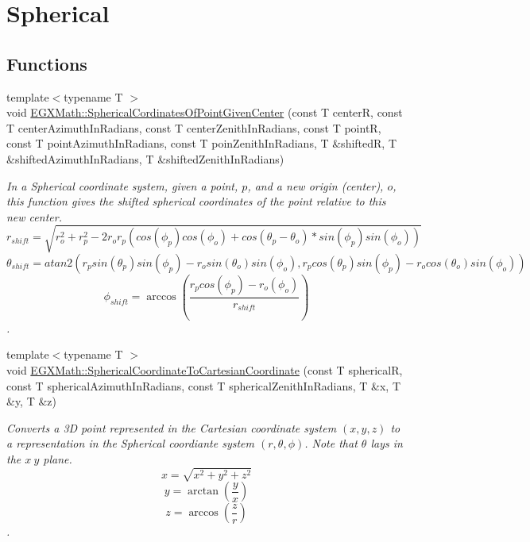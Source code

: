 \hypertarget{group___e_g_x_math-_conversions-_coordinate_conversions-3_d-_spherical}{}\section{Spherical}
\label{group___e_g_x_math-_conversions-_coordinate_conversions-3_d-_spherical}
\subsection*{Functions}
\begin{DoxyCompactItemize}
\item 
{\footnotesize template$<$typename T $>$ }\\void \mbox{\hyperlink{group___e_g_x_math-_conversions-_coordinate_conversions-3_d-_spherical_gaa9b50c4837e1cbea569de6f7bc90a3b6}{E\+G\+X\+Math\+::\+Spherical\+Cordinates\+Of\+Point\+Given\+Center}} (const T centerR, const T center\+Azimuth\+In\+Radians, const T center\+Zenith\+In\+Radians, const T pointR, const T point\+Azimuth\+In\+Radians, const T poin\+Zenith\+In\+Radians, T \&shiftedR, T \&shifted\+Azimuth\+In\+Radians, T \&shifted\+Zenith\+In\+Radians)
\begin{DoxyCompactList}\small\item\em In a Spherical coordinate system, given a point, $p$, and a new origin (center), $o$, this function gives the shifted spherical coordinates of the point relative to this new center. \[ r_{shift} = \sqrt{r_o^2+r_p^2 - 2 r_o r_p ( cos(\phi_p) cos(\phi_o) + cos(\theta_p-\theta_o) * sin(\phi_p) sin(\phi_o))}\] \[ \theta_{shift} = atan2( r_p sin(\theta_p) sin(\phi_p) - r_o sin(\theta_o) sin(\phi_o) , r_p cos(\theta_p) sin(\phi_p) - r_o cos(\theta_o) sin(\phi_o) )\] \[ \phi_{shift} = \arccos(\frac{r_p cos(\phi_p) - r_o (\phi_o)}{r_{shift}}) \]. \end{DoxyCompactList}\item 
{\footnotesize template$<$typename T $>$ }\\void \mbox{\hyperlink{group___e_g_x_math-_conversions-_coordinate_conversions-3_d-_spherical_ga3141fcb31751df8a24b5474de768b375}{E\+G\+X\+Math\+::\+Spherical\+Coordinate\+To\+Cartesian\+Coordinate}} (const T sphericalR, const T spherical\+Azimuth\+In\+Radians, const T spherical\+Zenith\+In\+Radians, T \&x, T \&y, T \&z)
\begin{DoxyCompactList}\small\item\em Converts a 3D point represented in the Cartesian coordinate system $(x,y,z)$ to a representation in the Spherical coordiante system $(r,\theta,\phi)$. Note that $\theta$ lays in the $x\ y$ plane. \[ x = \sqrt{x^2+y^2+z^2} \] \[ y = \arctan(\frac{y}{x}) \] \[ z = \arccos(\frac{z}{r}) \]. \end{DoxyCompactList}\item 

\end{DoxyCompactItemize}
